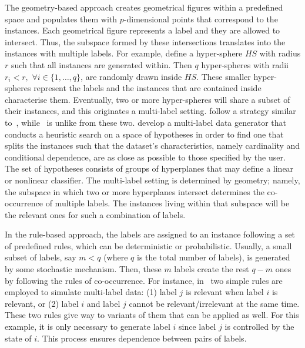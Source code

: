 \documentclass[review]{elsarticle}
\begin{document}
The geometry-based approach creates geometrical figures within a predefined space and populates them with $p$-dimensional points that correspond to the instances. Each geometrical figure represents a label and they are allowed to intersect. Thus, the subspace formed by these intersections translates into the instances with multiple labels. For example, \citet{EG4} define a hyper-sphere $HS$ with radius $r$ such that all instances are generated within. Then $q$ hyper-spheres with radii $r_{i} < r,$ $\forall i \in \{1,\ldots,q\}$, are randomly drawn inside $HS$. These smaller hyper-spheres represent the labels and the instances that are contained inside characterise them. Eventually, two or more hyper-spheres will share a subset of their instances, and this originates a multi-label setting.
\citet{MLG2} follow a strategy similar to~\citep{EG4}, while~\citet{MLG1} is unlike from these two. \citet{MLG1} develop a multi-label data generator that conducts a heuristic search on a space of hypotheses in order to find one that splits the instances such that the dataset's characteristics, namely cardinality and conditional dependence, are as close as possible to those specified by the user. The set of hypotheses consists of groups of hyperplanes that may define a linear or nonlinear classifier. The multi-label setting is determined by geometry; namely, the subspace in which two or more hyperplanes intersect determines the co-occurrence of multiple labels. The instances living within that subspace will be the relevant ones for such a combination of labels.

In the rule-based approach, the labels are assigned to an instance following a set of predefined rules, which can be deterministic or probabilistic. Usually, a small subset of labels, say $m < q$ (where $q$ is the total number of labels), is generated by some stochastic mechanism. Then, these $m$ labels create the rest $q-m$ ones by following the rules of co-occurrence. For instance, in~\cite{EG3} two simple rules are employed to simulate multi-label data: (1) label $j$ is relevant when label $i$ is relevant, or (2) label $i$ and label $j$ cannot be relevant/irrelevant at the same time. These two rules give way to variants of them that can be applied as well. For this example, it is only necessary to generate label $i$ since label $j$ is controlled by the state of $i$. This process ensures dependence between pairs of labels.
\end{document}
